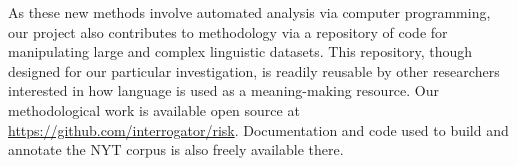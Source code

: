 As these new methods involve automated analysis via computer programming, our project also contributes to methodology via a repository of code for manipulating large and complex linguistic datasets. This repository, though designed for our particular investigation, is readily reusable by other researchers interested in how language is used as a meaning-making resource. Our methodological work is available open source at \url{https://github.com/interrogator/risk}. Documentation and code used to build and annotate the NYT corpus is also freely available there.


















